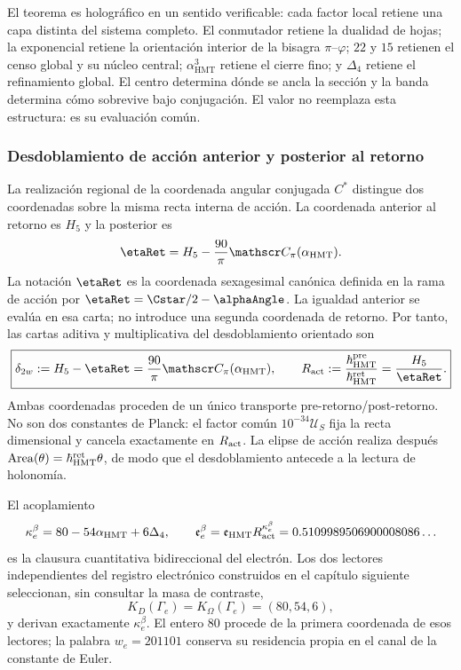 El teorema es holográfico en un sentido verificable: cada factor local
retiene una capa distinta del sistema completo. El conmutador retiene la
dualidad de hojas; la exponencial retiene la orientación interior de la
bisagra \(\pi\)--\(\varphi\); \(22\) y \(15\) retienen el censo global y
su núcleo central; \(\alpha_{\mathrm{HMT}}^3\) retiene el cierre fino; y
\(\Delta_4\) retiene el refinamiento global. El centro determina dónde se
ancla la sección y la banda determina cómo sobrevive bajo conjugación.
El valor no reemplaza esta estructura: es su evaluación común.

\subsubsection{Desdoblamiento de acción anterior y posterior al retorno}
\label{p12-83-c15-s2:sec:electron-desdoblamiento-two-way-rev9}

La realización regional de la coordenada angular conjugada \(C^*\) distingue dos coordenadas sobre la
misma recta interna de acción. La coordenada anterior al retorno es \(H_5\) y
la posterior es
\[
\etaRet
 =H_5-\frac{90}{\pi}\mathscr C_\pi(\alpha_{\rm HMT}).
\]
La notación \(\etaRet\) es la coordenada sexagesimal canónica definida en la
rama de acción por \(\etaRet=\Cstar/2-\alphaAngle\). La igualdad anterior se
evalúa en esa carta; no introduce una segunda coordenada de retorno.
Por tanto, las cartas aditiva y multiplicativa del desdoblamiento orientado
son
\begin{equation}
 \boxed{
 \delta_{2w}:=H_5-\etaRet
 =\frac{90}{\pi}\mathscr C_\pi(\alpha_{\rm HMT}),
 \qquad
 R_{\rm act}:=\frac{\hbar^{\rm pre}_{\rm HMT}}
 {\hbar^{\rm ret}_{\rm HMT}}
 =\frac{H_5}{\etaRet}.}
 \label{p12-83-c15-s2:eq:electron-desdoblamiento-two-way-rev9}
\end{equation}
Ambas coordenadas proceden de un único transporte pre-retorno/post-retorno.
No son dos constantes de Planck: el factor común
\(10^{-34}\mathcal U_S\) fija la recta dimensional y cancela exactamente en
\(R_{\rm act}\). La elipse de acción realiza después
\(\operatorname{Area}(\theta)=\hbar_{\rm HMT}^{\rm ret}\theta\), de modo que
el desdoblamiento antecede a la lectura de holonomía.

El acoplamiento
\begin{equation}
 \kappa_e^{\beta}
 =80-54\alpha_{\rm HMT}+6\Delta_4,
 \qquad
 \mathfrak e_e^{\beta}
 =\mathfrak e_{\rm HMT}R_{\rm act}^{\kappa_e^{\beta}}
 =0.5109989506900008086\ldots
 \label{p12-83-c15-s2:eq:electron-beta-two-way-rev9}
\end{equation}
es la clausura cuantitativa bidireccional del electrón. Los dos lectores
independientes del registro electrónico construidos en el capítulo siguiente
seleccionan, sin consultar la masa de contraste,
\[
 K_D(\Gamma_e)=K_\Omega(\Gamma_e)=(80,54,6),
\]
y derivan exactamente \(\kappa_e^\beta\). El entero \(80\) procede de la
primera coordenada de esos lectores; la palabra \(w_e=201101\) conserva su
residencia propia en el canal de la constante de Euler.

